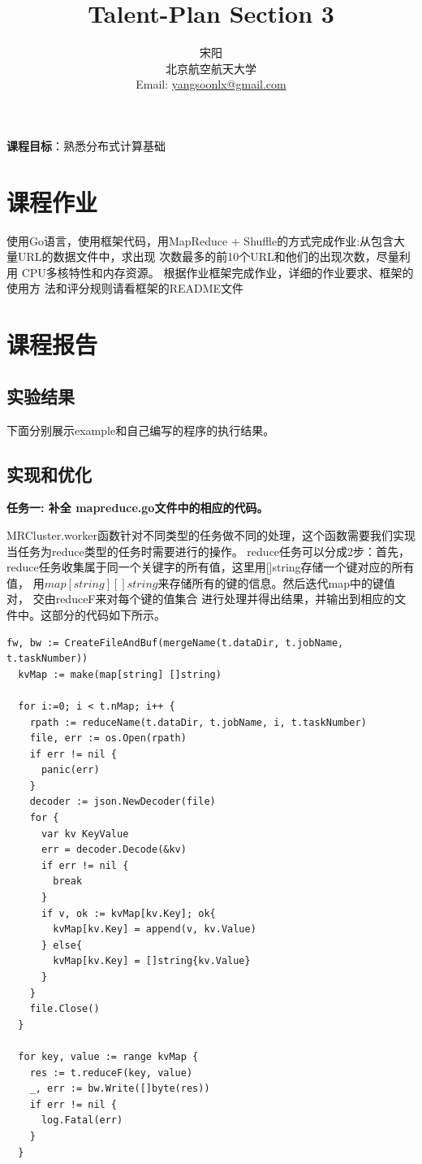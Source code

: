 \documentclass[UTF8]{ctexart}
\title{\huge{\heiti Talent-Plan Section 3}}
\author{\small{\kaishu 宋阳}\\[2pt]
\small{\kaishu 北京航空航天大学}\\[2pt]
\small{Email:}
\url{yangsoonlx@gmail.com}
}
\date{} %
\begin{document}
\maketitle

\begin{flushleft}
\textbf{课程目标}：熟悉分布式计算基础 \\[8pt]
\end{flushleft}
\section{课程作业}\label{sec1}

使用Go语言，使用框架代码，用MapReduce + Shuffle的方式完成作业:从包含大量URL的数据文件中，求出现
次数最多的前10个URL和他们的出现次数，尽量利用
CPU多核特性和内存资源。
根据作业框架完成作业，详细的作业要求、框架的使用方
法和评分规则请看框架的README文件 \\

\section{课程报告}\label{sec2}

\subsection{实验结果}

下面分别展示example和自己编写的程序的执行结果。

\subsection{实现和优化}

\textbf{任务一: 补全 mapreduce.go文件中的相应的代码。}

MRCluster.worker函数针对不同类型的任务做不同的处理，这个函数需要我们实现当任务为reduce类型的任务时需要进行的操作。
reduce任务可以分成2步：首先，reduce任务收集属于同一个关键字的所有值，这里用[]string存储一个键对应的所有值，
用$map[string] []string$来存储所有的键的信息。然后迭代map中的键值对，
交由reduceF来对每个键的值集合 进行处理并得出结果，并输出到相应的文件中。这部分的代码如下所示。
\begin{lstlisting}[language={Golang}]
  fw, bw := CreateFileAndBuf(mergeName(t.dataDir, t.jobName, t.taskNumber))
  kvMap := make(map[string] []string)
  
  for i:=0; i < t.nMap; i++ {
    rpath := reduceName(t.dataDir, t.jobName, i, t.taskNumber)
    file, err := os.Open(rpath)
    if err != nil {
      panic(err)
    }
    decoder := json.NewDecoder(file)
    for {
      var kv KeyValue
      err = decoder.Decode(&kv)
      if err != nil {
        break
      }
      if v, ok := kvMap[kv.Key]; ok{
        kvMap[kv.Key] = append(v, kv.Value)
      } else{
        kvMap[kv.Key] = []string{kv.Value}
      }
    }
    file.Close()
  }
  
  for key, value := range kvMap {
    res := t.reduceF(key, value)
    _, err := bw.Write([]byte(res))
    if err != nil {
      log.Fatal(err)
    }
  }
\end{lstlisting}
\end{document}
